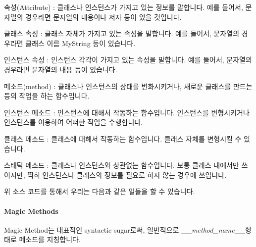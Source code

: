 \documentclass[titlepage]{report}
\begin{document}
\begin{compactitem}
\item 속성(Attribute) : 클래스나 인스턴스가 가지고 있는 정보를 말합니다. 예를 들어서, 문자열의 경우라면 문자열의 내용이나 저자 등이 있을 것입니다. 
\begin{compactitem} 
\item 클래스 속성  : 클래스 자체가 가지고 있는 속성을 말합니다. 예를 들어서, 문자열의 경우라면 클래스 이름 MyString 등이 있습니다. 
\item 인스턴스 속성 : 인스턴스 각각이 가지고 있는 속성을 말합니다. 예를 들어서, 문자열의 경우라면 문자열의 내용 등이 있습니다. 
\end{compactitem}
\item 메소드(method) : 클래스나 인스턴스의 상태를 변화시키거나, 새로운 클래스를 만드는 등의 작업을 하는 함수입니다. 
\begin{compactitem} 
\item 인스턴스 메소드 : 인스턴스에 대해서 작동하는 함수입니다. 인스턴스를 변형시키거나 인스턴스를 이용하여 어떠한 작업을 수행합니다. 
\item 클래스 메소드 : 클래스에 대해서 작동하는 함수입니다. 클래스 자체를 변형시킬 수 있습니다. 
\item 스태틱 메소드 : 클래스나 인스턴스와 상관없는 함수입니다. 보통 클래스 내에서만 쓰이지만, 딱히 인스턴스나 클래스의 정보를 필요로 하지 않는 경우에 쓰입니다. 

\end{compactitem}
\end{compactitem}



위 소스 코드를 통해서 우리는 다음과 같은 일들을 할 수 있습니다. 





\paragraph{Magic Methods} Magic Method는 대표적인 syntactic sugar로써, 일반적으로 \_\_\textit{method\_name}\_\_형태로 메소드를 지칭합니다.
%
%
%
%
%
\end{document}

